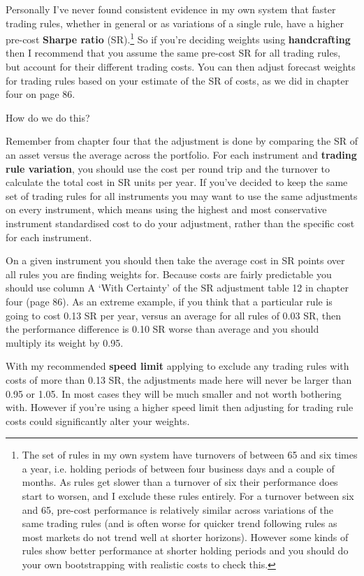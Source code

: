 Personally I've never found consistent evidence in my own system that faster trading rules, whether in general or as variations of a single rule, have a higher pre-cost \textbf{Sharpe ratio} (SR).\footnote{The set of rules in my own system have turnovers of between 65 and six times a year, i.e. holding periods of between four business days and a couple of months. As rules get slower than a turnover of six their performance does start to worsen, and I exclude these rules entirely. For a turnover between six and 65, pre-cost performance is relatively similar across variations of the same trading rules (and is often worse for quicker trend following rules as most markets do not trend well at shorter horizons). However some kinds of rules show better performance at shorter holding periods and you should do your own bootstrapping with realistic costs to check this.} So if you're deciding weights using \textbf{handcrafting} then I recommend that you assume the same pre-cost SR for all trading rules, but account for their different trading costs. You can then adjust forecast weights for trading rules based on your estimate of the SR of costs, as we did in chapter four on page 86.

How do we do this?

Remember from chapter four that the adjustment is done by comparing the SR of an asset versus the average across the portfolio. For each instrument and \textbf{trading rule variation}, you should use the cost per round trip and the turnover to calculate the total cost in SR units per year. If you've decided to keep the same set of trading rules for all instruments you may want to use the same adjustments on every instrument, which means using the highest and most conservative instrument standardised cost to do your adjustment, rather than the specific cost for each instrument.

On a given instrument you should then take the average cost in SR points over all rules you are finding weights for. Because costs are fairly predictable you should use column A ‘With Certainty' of the SR adjustment table 12 in chapter four (page 86). As an extreme example, if you think that a particular rule is going to cost 0.13 SR per year, versus an average for all rules of 0.03 SR, then the performance difference is 0.10 SR worse than average and you should multiply its weight by 0.95.

With my recommended \textbf{speed limit} applying to exclude any trading rules with costs of more than 0.13 SR, the adjustments made here will never be larger than 0.95 or 1.05. In most cases they will be much smaller and not worth bothering with. However if you're using a higher speed limit then adjusting for trading rule costs could significantly alter your weights.

